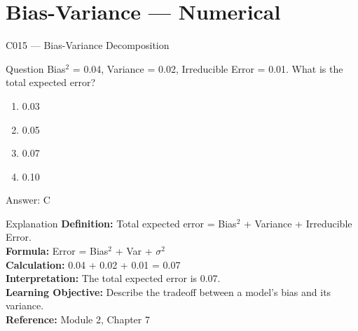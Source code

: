 \documentclass[aspectratio=169,8pt]{beamer}
\begin{document}
	\section{Bias-Variance --- Numerical}
	
	\begin{frame}{C015 --- Bias-Variance Decomposition}
		\begin{block}{Question}
			Bias$^2$ = 0.04, Variance = 0.02, Irreducible Error = 0.01. What is the total expected error?
			\begin{enumerate}
				\item 0.03
				\item 0.05
				\item 0.07
				\item 0.10
			\end{enumerate}
		\end{block}
		\begin{exampleblock}{Answer: C}\end{exampleblock}
		\begin{block}{Explanation}
			\textbf{Definition:} Total expected error = Bias$^2$ + Variance + Irreducible Error.\\
			\textbf{Formula:} Error = Bias$^2$ + Var + $\sigma^2$\\
			\textbf{Calculation:} 0.04 + 0.02 + 0.01 = 0.07\\
			\textbf{Interpretation:} The total expected error is 0.07.\\
			\textbf{Learning Objective:} Describe the tradeoff between a model's bias and its variance.\\
			\textbf{Reference:} Module 2, Chapter 7
		\end{block}
	\end{frame}
	
\end{document}
